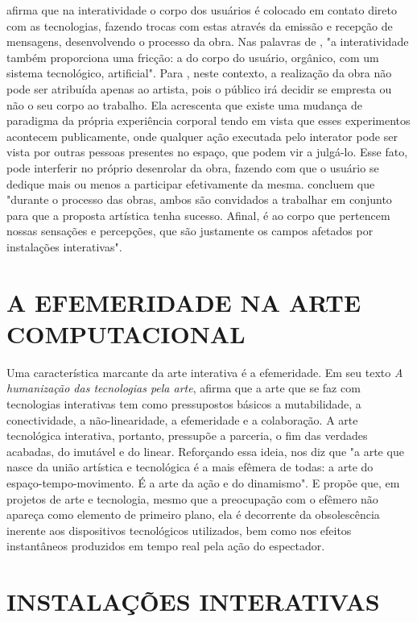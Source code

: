  afirma que na interatividade o corpo dos usuários é colocado em contato direto com as tecnologias, fazendo trocas com estas através da emissão e recepção de mensagens, desenvolvendo o processo da obra. Nas palavras de , "a interatividade também proporciona uma fricção: a do corpo do usuário, orgânico, com um sistema tecnológico, artificial". Para , neste contexto, a realização da obra não pode ser atribuída apenas ao artista, pois o público irá decidir se empresta ou não o seu corpo ao trabalho. Ela acrescenta que existe uma mudança de paradigma da própria experiência corporal tendo em vista que esses experimentos acontecem publicamente, onde qualquer ação executada pelo interator pode ser vista por outras pessoas presentes no espaço, que podem vir a julgá-lo. Esse fato, pode interferir no próprio desenrolar da obra, fazendo com que o usuário se dedique mais ou menos a participar efetivamente da mesma.  concluem que "durante o processo das obras, ambos são convidados a trabalhar em conjunto para que a proposta artística tenha sucesso. Afinal, é ao corpo que pertencem nossas sensações e percepções, que são justamente os campos afetados por instalações interativas".

\section{A EFEMERIDADE NA ARTE COMPUTACIONAL}

Uma característica marcante da arte interativa é a efemeridade. Em seu texto \textit{A humanização das tecnologias pela arte},  afirma que a arte que se faz com tecnologias interativas tem como pressupostos básicos a mutabilidade, a conectividade, a não-linearidade, a efemeridade e a colaboração. A arte tecnológica interativa, portanto, pressupõe a parceria, o fim das verdades acabadas, do imutável e do linear. Reforçando essa ideia,  nos diz que "a arte que nasce da união artística e tecnológica é a mais efêmera de todas: a arte do espaço-tempo-movimento. É a arte da ação e do dinamismo". E  propõe que, em projetos de arte e tecnologia, mesmo que a preocupação com o efêmero não apareça como elemento de primeiro plano, ela é decorrente da obsolescência inerente aos dispositivos tecnológicos utilizados, bem como nos efeitos instantâneos produzidos em tempo real pela ação do espectador.

\section{INSTALAÇÕES INTERATIVAS}

